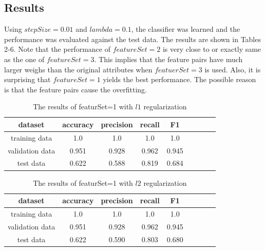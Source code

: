 \subsection*{Results}
Using $stepSize=0.01$ and $lambda=0.1$, the classifier was learned and the performance was evaluated against the test data. The results are shown in Tables 2-6. Note that the performance of $featureSet=2$ is very close to or exactly same as the one of $featureSet=3$. This implies that the feature pairs have much larger weighs than the original attributes when $featuerSet=3$ is used. Also, it is surprising that $featureSet=1$ yields the best performance. The possible reason is that the feature pairs cause the overfitting. 

\begin{table}[htb]
  \begin{center}
  \begin{tabular}{|c|c|c|c|c|c|c|c|c|} \hline
    dataset & accuracy & precision & recall & F1 \\ \hline
    training data & 1.0 & 1.0 & 1.0 & 1.0 \\ \hline
    validation data & 0.951 & 0.928 & 0.962 & 0.945 \\ \hline
    test data & 0.622 & 0.588 & 0.819 & 0.684 \\ \hline
  \end{tabular}
  \caption{The results of featurSet=1 with $l1$ regularization}
  \label{tab:result_1_l1}
  \end{center}
\end{table}

\begin{table}[htb]
  \begin{center}
  \begin{tabular}{|c|c|c|c|c|c|c|c|c|} \hline
    dataset & accuracy & precision & recall & F1 \\ \hline
    training data & 1.0 & 1.0 & 1.0 & 1.0 \\ \hline
    validation data & 0.951 & 0.928 & 0.962 & 0.945 \\ \hline
    test data & 0.622 & 0.590 & 0.803 & 0.680 \\ \hline
  \end{tabular}
  \caption{The results of featurSet=1 with $l2$ regularization}
  \label{tab:result_1_l2}
  \end{center}
\end{table}

